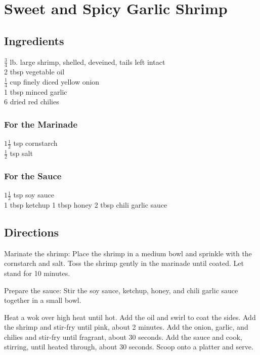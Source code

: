 \documentclass{article}
\newcounter{qcounter}
\begin{document}
\section*{Sweet and Spicy Garlic Shrimp}

\subsection*{Ingredients}
$\frac{3}{4}$ lb. large shrimp, shelled, deveined, tails left intact\\
2 tbsp vegetable oil\\
$\frac{1}{4}$  cup finely diced yellow onion\\
1 tbsp minced garlic\\
6 dried red chilies\\

\subsubsection*{For the Marinade}
$1 \frac{1}{2}$ tsp cornstarch\\
$\frac{1}{2}$ tsp salt\\

\subsubsection*{For the Sauce}
$1 \frac{1}{2}$ tsp soy sauce\\
1 tbsp ketchup
1 tbsp honey
2 tbsp chili garlic sauce

\subsection*{Directions}
\begin{list}{:~}{}
\item Marinate the shrimp:  Place the shrimp in a medium bowl and sprinkle with the cornstarch and salt. Toss the shrimp gently in the marinade until coated.  Let stand for 10 minutes. 
\item Prepare the sauce:  Stir the soy sauce, ketchup, honey, and chili garlic sauce together in a small bowl.
\item Heat a wok over high heat until hot.  Add the oil and swirl to coat the sides.  Add the shrimp and stir-fry until pink, about 2 minutes.  Add the onion, garlic, and chilies and stir-fry until fragrant, about 30 seconds.  Add the sauce and cook, stirring, until heated through, about 30 seconds.  Scoop onto a platter and serve.
\end{list}
\end{document}
